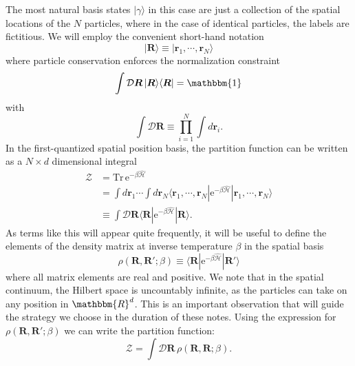 \documentclass[prb,aps,amssym,nofootinbib,floatfix,notitlepage]{revtex4-1}
\renewcommand{\vec}[1]{\boldsymbol{#1}}
\newcommand{\e}[1]{\mathrm{e}^{#1}}
\newcommand{\R}{\vec{R}}
\begin{document}
The most natural basis states $|\gamma\rangle$ in this case are just a
collection of the spatial locations of the $N$ particles, where in the case of
identical particles, the labels are fictitious. We will employ the convenient
short-hand notation 
%
\begin{equation}
    |\R\rangle \equiv |\vec{r}_1, \cdots, \vec{r}_N \rangle
\end{equation}
%
where particle conservation enforces the normalization constraint
%
\begin{equation}
\int \mathcal{D}\R\, |\R\rangle \langle \R | = \mathbbm{1}
\label{eq:Norm}
\end{equation}
%
with 
%
\begin{equation}
    \int\mathcal{D} \R  \equiv \prod_{i=1}^N \int d \vec{r}_i.
\end{equation}
%
In the first-quantized spatial position basis, the partition function can be
written as a $N \times d$ dimensional integral
%
\begin{align}
    \mathcal{Z} &= \mathrm{Tr}\, \e{-\beta \hat{\mathcal{H}}}  \nonumber \\
                &= \int d\vec{r}_1 \cdots \int d\vec{r}_N \langle \vec{r}_1,
    \cdots, \vec{r}_N | \e{-\beta \hat{\mathcal{H}}}| \vec{r}_1, \cdots,
    \vec{r}_N \rangle \nonumber \\
&\equiv \int \mathcal{D} \R \langle \R | \e{-\beta \hat{\mathcal{H}}} | \R
    \rangle.
\label{eq:ZDR}
\end{align}
%
As terms like this will appear quite frequently, it will be useful to define
the elements of the density matrix at inverse temperature $\beta$ in the
spatial basis
%
\begin{equation}
    \rho(\R, \R'; \beta) \equiv \langle \R | \e{-\beta \hat{\mathcal{H}}} |
    \R'\rangle
\end{equation}
%
where all matrix elements are real and positive. We note that in the spatial
continuum, the Hilbert space is uncountably infinite, as the particles can take
on any position in $\mathbbm{R}^d$. This is an important observation that will
guide the strategy we choose in the duration of these notes. Using the
expression for $\rho(\R,\R';\beta)$ we can write the partition function:
%
\begin{equation}
\mathcal{Z} = \int \mathcal{D}\R \, \rho(\R,\R;\beta).
\label{eq:Zrho}
\end{equation}
%
\end{document}
